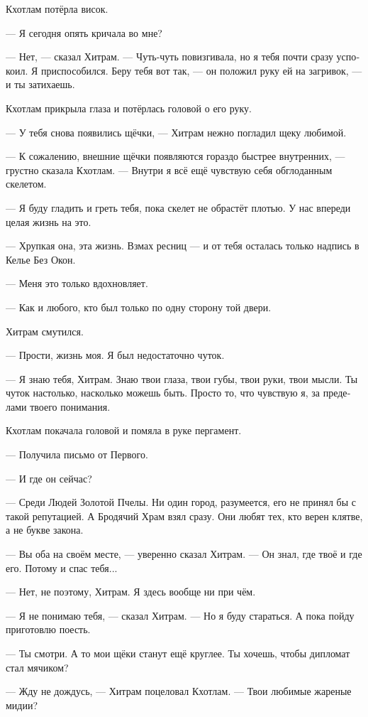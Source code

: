 \documentclass[a4paper,12pt,fleqn]{book}\usepackage{cooltooltips}\usepackage{polyglossia}\setdefaultlanguage{russian}\setotherlanguage{english}\defaultfontfeatures{Ligatures=TeX,Mapping=tex-text} \usepackage{xcolor}\definecolor{lightgray}{HTML}{bbbbbb}\color{lightgray}\newcommand{\ml}[3]{\textenglish{\textcolor{black}{#3}}}
\begin{document}
Кхотлам потёрла висок.

--- Я сегодня опять кричала во мне?

--- Нет, --- сказал Хитрам.
--- Чуть-чуть повизгивала, но я тебя почти сразу успокоил.
Я приспособился.
Беру тебя вот так, --- он положил руку ей на загривок, --- и ты затихаешь.

Кхотлам прикрыла глаза и потёрлась головой о его руку.

--- У тебя снова появились щёчки, --- Хитрам нежно погладил щеку любимой.

--- К сожалению, внешние щёчки появляются гораздо быстрее внутренних, --- грустно сказала Кхотлам.
--- Внутри я всё ещё чувствую себя обглоданным скелетом.

--- Я буду гладить и греть тебя, пока скелет не обрастёт плотью.
У нас впереди целая жизнь на это.

--- Хрупкая она, эта жизнь.
Взмах ресниц --- и от тебя осталась только надпись в Келье Без Окон.

--- Меня это только вдохновляет.

--- Как и любого, кто был только по одну сторону той двери.

Хитрам смутился.

--- Прости, жизнь моя.
Я был недостаточно чуток.

--- Я знаю тебя, Хитрам.
Знаю твои глаза, твои губы, твои руки, твои мысли.
Ты чуток настолько, насколько можешь быть.
Просто то, что чувствую я, за пределами твоего понимания.

Кхотлам покачала головой и помяла в руке пергамент.

--- Получила письмо от Первого.

--- И где он сейчас?

--- Среди Людей Золотой Пчелы.
Ни один город, разумеется, его не принял бы с такой репутацией.
А Бродячий Храм взял сразу.
Они любят тех, кто верен клятве, а не букве закона.

--- Вы оба на своём месте, --- уверенно сказал Хитрам.
--- Он знал, где твоё и где его.
Потому и спас тебя...

--- Нет, не поэтому, Хитрам.
Я здесь вообще ни при чём.

--- Я не понимаю тебя, --- сказал Хитрам.
--- Но я буду стараться.
А пока пойду приготовлю поесть.

--- Ты смотри.
А то мои щёки станут ещё круглее.
Ты хочешь, чтобы дипломат стал мячиком?

--- Жду не дождусь, --- Хитрам поцеловал Кхотлам.
--- Твои любимые жареные мидии?
\end{document}
